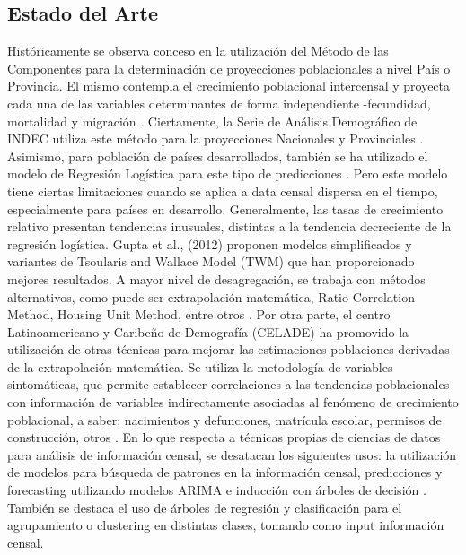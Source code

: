 \documentclass{article}
\theoremstyle{mytheoremstyle}
\theoremstyle{mytheoremstyle}
\theoremstyle{myproblemstyle}
\begin{document}
   \subsection{Estado del Arte}
Históricamente se observa conceso en la utilización del Método de las Componentes para la determinación de proyecciones
poblacionales a nivel País o Provincia. El mismo contempla el crecimiento poblacional intercensal y proyecta cada una
de las variables determinantes de forma independiente -fecundidad, mortalidad y migración .\newline\newline  
Ciertamente, la Serie de Análisis Demográfico de INDEC utiliza este método para la proyecciones Nacionales y Provinciales .
Asimismo, para población de países desarrollados, también se ha utilizado el modelo de Regresión Logística para este tipo de predicciones . Pero este modelo tiene ciertas limitaciones cuando se aplica a data censal dispersa en el tiempo, especialmente para países en desarrollo. Generalmente, las tasas de crecimiento relativo presentan tendencias inusuales, distintas a la tendencia decreciente de la regresión logística. Gupta et al., (2012) proponen modelos simplificados y variantes de Tsoularis and Wallace Model (TWM) que han proporcionado mejores resultados.
A mayor nivel de desagregación, se trabaja con métodos alternativos, como puede ser extrapolación matemática, 
Ratio-Correlation Method, Housing Unit Method, entre otros .\newline\newline
Por otra parte, el centro Latinoamericano y Caribeño de Demografía (CELADE) ha promovido la utilización 
de otras técnicas para mejorar las estimaciones poblaciones derivadas de la extrapolación matemática. 
Se utiliza la metodología de variables sintomáticas, que permite establecer correlaciones a las tendencias poblacionales
con información de variables indirectamente asociadas al fenómeno de crecimiento poblacional,
a saber: nacimientos y defunciones, matrícula escolar, permisos de construcción, otros .\newline\newline 
En lo que respecta a técnicas propias de ciencias de datos para análisis de información censal, 
se desatacan los siguientes usos: la utilización de modelos para búsqueda de patrones en la información censal,
predicciones y forecasting utilizando modelos ARIMA e inducción con árboles de decisión  . 
También se destaca el uso de árboles de regresión y clasificación para el agrupamiento o clustering en distintas clases,
tomando como input información censal.
\end{document}
